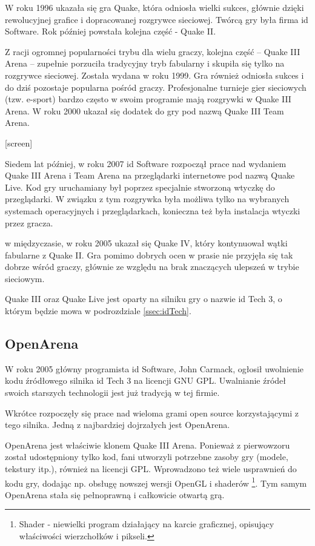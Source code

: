 W roku 1996 ukazała się gra Quake, która odniosła wielki sukces, głównie dzięki
rewolucyjnej grafice i dopracowanej rozgrywce sieciowej. Twórcą gry była firma
id Software. Rok później powstała kolejna część - Quake II.

Z racji ogromnej popularności trybu dla wielu graczy, kolejna część -- Quake III
Arena -- zupełnie porzuciła tradycyjny tryb fabularny i skupiła się tylko na
rozgrywce sieciowej. Została wydana w roku 1999.
Gra również odniosła sukces i do dziś pozostaje popularna
pośród graczy. Profesjonalne turnieje gier sieciowych (tzw. e-sport) bardzo
często w swoim programie mają rozgrywki w Quake III Arena.
W roku 2000 ukazał się dodatek do gry pod nazwą Quake III Team Arena.

[screen]

Siedem lat później, w roku 2007 id Software rozpoczął prace nad wydaniem
Quake III Arena i Team Arena na przeglądarki internetowe pod nazwą Quake Live.
Kod gry uruchamiany był poprzez specjalnie stworzoną wtyczkę do
przeglądarki. W związku z tym rozgrywka była możliwa tylko na wybranych systemach
operacyjnych i przeglądarkach, konieczna też była instalacja wtyczki przez
gracza.

w międzyczasie, w roku 2005 ukazał się Quake IV, który kontynuował wątki fabularne
z Quake II. Gra pomimo dobrych ocen w prasie nie przyjęła się tak dobrze
wśród graczy, głównie ze względu na brak znaczących ulepszeń w trybie sieciowym.

Quake III oraz Quake Live jest oparty na silniku gry o nazwie id Tech 3, o którym
będzie mowa w podrozdziale \ref{ssec:idTech}.

\subsection{OpenArena}
\label{ssec:openArena}

W roku 2005 główny programista id Software, John Carmack, ogłosił uwolnienie
kodu źródłowego silnika id Tech 3 na licencji GNU GPL. Uwalnianie źródeł swoich
starszych technologii jest już tradycją w tej firmie.

Wkrótce rozpoczęły się prace nad wieloma grami open source korzystającymi
z tego silnika. Jedną z najbardziej dojrzałych jest OpenArena.

OpenArena jest właściwie klonem Quake III Arena. Ponieważ z pierwowzoru został
udostępniony tylko kod, fani utworzyli potrzebne zasoby gry (modele, tekstury itp.),
również na licencji GPL. Wprowadzono też wiele usprawnień do kodu gry,
dodając np. obsługę nowszej wersji OpenGL i shaderów \footnote{Shader - niewielki program
  działający na karcie graficznej, opisujący właściwości wierzchołków
  i pikseli.}. Tym samym OpenArena stała się pełnoprawną
i całkowicie otwartą grą.

